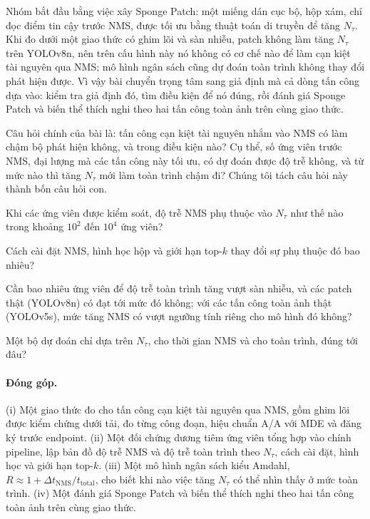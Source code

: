 \documentclass[12pt,a4paper]{article}
\newcommand{\Ntau}{N_{\tau}}
\begin{document}
Nhóm bắt đầu bằng việc xây Sponge Patch: một miếng dán cục bộ, hộp xám, chỉ đọc điểm tin cậy trước NMS, được tối ưu bằng thuật toán di truyền để tăng $\Ntau$. Khi đo dưới một giao thức có ghim lõi và sàn nhiễu, patch không làm tăng $\Ntau$ trên YOLOv8n, nên trên cấu hình này nó không có cơ chế nào để làm cạn kiệt tài nguyên qua NMS; mô hình ngân sách cũng dự đoán toàn trình không thay đổi phát hiện được. Vì vậy bài chuyển trọng tâm sang giả định mà cả dòng tấn công dựa vào: kiểm tra giả định đó, tìm điều kiện để nó đúng, rồi đánh giá Sponge Patch và biến thể thích nghi theo hai tấn công toàn ảnh trên cùng giao thức.

Câu hỏi chính của bài là: tấn công cạn kiệt tài nguyên nhắm vào NMS có làm chậm bộ phát hiện không, và trong điều kiện nào? Cụ thể, số ứng viên trước NMS, đại lượng mà các tấn công này tối ưu, có dự đoán được độ trễ không, và từ mức nào thì tăng $\Ntau$ mới làm toàn trình chậm đi? Chúng tôi tách câu hỏi này thành bốn câu hỏi con.
\begin{description}[leftmargin=2.5em,labelwidth=2.2em,itemsep=2pt]
\item[Q1] Khi các ứng viên được kiểm soát, độ trễ NMS phụ thuộc vào $\Ntau$ như thế nào trong khoảng $10^2$ đến $10^4$ ứng viên?
\item[Q2] Cách cài đặt NMS, hình học hộp và giới hạn top-$k$ thay đổi sự phụ thuộc đó bao nhiêu?
\item[Q3] Cần bao nhiêu ứng viên để độ trễ toàn trình tăng vượt sàn nhiễu, và các patch thật (YOLOv8n) có đạt tới mức đó không; với các tấn công toàn ảnh thật (YOLOv5s), mức tăng NMS có vượt ngưỡng tính riêng cho mô hình đó không?
\item[Q4] Một bộ dự đoán chỉ dựa trên $\Ntau$, cho thời gian NMS và cho toàn trình, đúng tới đâu?
\end{description}

\paragraph{Đóng góp.}
(i) Một giao thức đo cho tấn công cạn kiệt tài nguyên qua NMS, gồm ghim lõi được kiểm chứng dưới tải, đo từng công đoạn, hiệu chuẩn A/A với MDE và đăng ký trước endpoint. (ii) Một đối chứng dương tiêm ứng viên tổng hợp vào chính pipeline, lập bản đồ độ trễ NMS và độ trễ toàn trình theo $\Ntau$, cách cài đặt, hình học và giới hạn top-$k$. (iii) Một mô hình ngân sách kiểu Amdahl, $R \approx 1 + \Delta t_{\mathrm{NMS}}/t_{\mathrm{total}}$, cho biết khi nào việc tăng $\Ntau$ có thể nhìn thấy ở mức toàn trình. (iv) Một đánh giá Sponge Patch và biến thể thích nghi theo hai tấn công toàn ảnh trên cùng giao thức.
\end{document}
